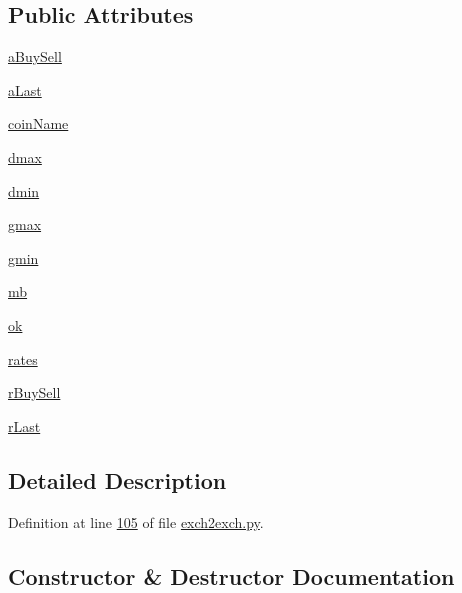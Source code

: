 \subsection*{Public Attributes}
\begin{DoxyCompactItemize}
\item 
\hyperlink{classexch2exch_1_1_differences_aac9b76364eb6e0ee83417c0128aaa001}{a\+Buy\+Sell}
\item 
\hyperlink{classexch2exch_1_1_differences_abd4dd96bd69025147d0bdb33d9c69345}{a\+Last}
\item 
\hyperlink{classexch2exch_1_1_differences_a0fb17548553b86b0ae62c2ef1a30981b}{coin\+Name}
\item 
\hyperlink{classexch2exch_1_1_differences_a261a74cc25d77b2608898fa5611f9f0b}{dmax}
\item 
\hyperlink{classexch2exch_1_1_differences_a7825bfca16b5775aa770c8810412b215}{dmin}
\item 
\hyperlink{classexch2exch_1_1_differences_a569f2a6fa0e33ad725c3c3ada259ddcc}{gmax}
\item 
\hyperlink{classexch2exch_1_1_differences_a33c9add531b5b46c49ae322657343382}{gmin}
\item 
\hyperlink{classexch2exch_1_1_differences_a81c81e9c15b5ea8a5d39bb99d85250e1}{mb}
\item 
\hyperlink{classexch2exch_1_1_differences_a6de3ee563584c83a97ba815db8ec7831}{ok}
\item 
\hyperlink{classexch2exch_1_1_differences_a64aec2fc7f20028f0bd834908cbea116}{rates}
\item 
\hyperlink{classexch2exch_1_1_differences_a3cbdf344e8e0b804c611e6b9e3a3d1bd}{r\+Buy\+Sell}
\item 
\hyperlink{classexch2exch_1_1_differences_a3c26c51929ce75e055f8a606aaeb849d}{r\+Last}
\end{DoxyCompactItemize}


\subsection{Detailed Description}


Definition at line \hyperlink{exch2exch_8py_source_l00105}{105} of file \hyperlink{exch2exch_8py_source}{exch2exch.\+py}.



\subsection{Constructor \& Destructor Documentation}
